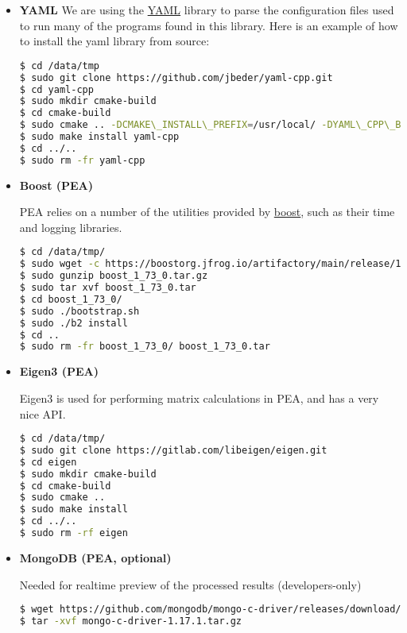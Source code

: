 \begin{itemize}
  

\item \textbf{YAML}
We are using the \href{https://github.com/jbeder/yaml-cpp}{YAML} library
to parse the configuration files used to run many of the programs found
in this library. Here is an example of how to install the yaml library
from source:

\begin{lstlisting}[language=bash]
$ cd /data/tmp
$ sudo git clone https://github.com/jbeder/yaml-cpp.git
$ cd yaml-cpp
$ sudo mkdir cmake-build
$ cd cmake-build
$ sudo cmake .. -DCMAKE\_INSTALL\_PREFIX=/usr/local/ -DYAML\_CPP\_BUILD\_TESTS=OFF
$ sudo make install yaml-cpp
$ cd ../..
$ sudo rm -fr yaml-cpp
\end{lstlisting}

\item\textbf{Boost (PEA)}

PEA relies on a number of the utilities provided by
\href{https://www.boost.org/}{boost}, such as their time and logging
libraries.

\begin{lstlisting}[language=bash]
$ cd /data/tmp/
$ sudo wget -c https://boostorg.jfrog.io/artifactory/main/release/1.73.0/source/boost_1_73_0.tar.gz
$ sudo gunzip boost_1_73_0.tar.gz
$ sudo tar xvf boost_1_73_0.tar
$ cd boost_1_73_0/
$ sudo ./bootstrap.sh
$ sudo ./b2 install
$ cd ..
$ sudo rm -fr boost_1_73_0/ boost_1_73_0.tar
\end{lstlisting}

\item\textbf{Eigen3 (PEA)}

Eigen3 is used for performing matrix calculations in PEA, and has a very
nice API.

\begin{lstlisting}[language=bash]
$ cd /data/tmp/
$ sudo git clone https://gitlab.com/libeigen/eigen.git
$ cd eigen
$ sudo mkdir cmake-build
$ cd cmake-build
$ sudo cmake ..
$ sudo make install
$ cd ../..
$ sudo rm -rf eigen
\end{lstlisting}

\item\textbf{MongoDB (PEA, optional)}

Needed for realtime preview of the processed results (developers-only)

\begin{lstlisting}[language=bash]
$ wget https://github.com/mongodb/mongo-c-driver/releases/download/1.17.1/mongo-c-driver-1.17.1.tar.gz
$ tar -xvf mongo-c-driver-1.17.1.tar.gz


\end{lstlisting}
\end{itemize}
